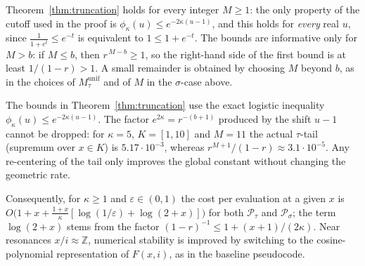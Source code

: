 \begin{remark}[Range of $M$]\label{rem:M-normalisation}
Theorem~\ref{thm:truncation} holds for every integer $M\ge1$: the only property of the cutoff used in the proof is
$\phi_\kappa(u)\le e^{-2\kappa(u-1)}$, and this holds for \emph{every} real $u$, since
$\tfrac{1}{1+e^{t}}\le e^{-t}$ is equivalent to $1\le 1+e^{-t}$. The bounds are informative only for $M>b$:
if $M\le b$, then $r^{\,M-b}\ge1$, so the right-hand side of the first bound is at least $1/(1-r)>1$.
A small remainder is obtained by choosing $M$ beyond $b$, as in the choices of $M_\tau^{\mathrm{unif}}$ and of $M$ in the $\sigma$-case above.
\end{remark}

\begin{remark}
The bounds in Theorem~\ref{thm:truncation} use the exact logistic inequality $\phi_\kappa(u)\le e^{-2\kappa(u-1)}$. The factor $e^{2\kappa}=r^{-(b+1)}$ produced by the shift $u-1$ cannot be dropped: for $\kappa=5$, $K=[1,10]$ and $M=11$ the actual $\tau$-tail (supremum over $x\in K$) is $5.17\cdot10^{-3}$, whereas $r^{M+1}/(1-r)\approx3.1\cdot10^{-5}$. Any re-centering of the tail only improves the global constant without changing the geometric rate.
\end{remark}


Consequently, for $\kappa\ge1$ and $\varepsilon\in(0,1)$ the cost per evaluation at a given $x$ is $O\!\bigl(1+x+\tfrac{1+x}{\kappa}[\log(1/\varepsilon)+\log(2+x)]\bigr)$ for both $\mathcal P_\tau$ and $\mathcal P_\sigma$; the term $\log(2+x)$ stems from the factor $(1-r)^{-1}\le 1+(x+1)/(2\kappa)$. Near resonances $x/i\approx\mathbb{Z}$, numerical stability is improved by switching to the cosine-polynomial representation of $F(x,i)$, as in the baseline pseudocode.

